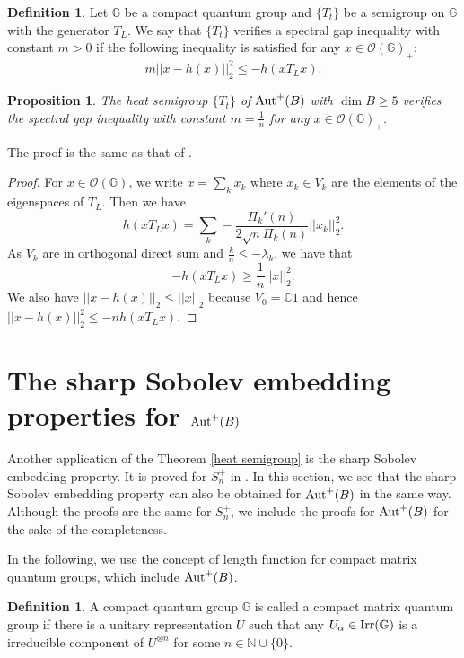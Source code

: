 \documentclass[12pt]{amsart}
\theoremstyle{plain} %
\newtheorem{proposition}[equation]{Proposition}
\theoremstyle{definition}
\newtheorem{definition}[equation]{Definition}
\theoremstyle{remark}
\begin{document}
  \begin{definition}
 Let $\mathbb{G}$ be a compact quantum group and $\{T_t\}$ be a semigroup on $\mathbb{G}$ with the generator $T_L$. We say that $\{T_t\}$ verifies a spectral gap inequality with constant $m>0$ if the following inequality is satisfied for any $x\in \mathcal{O}(\mathbb{G})_+$:
 \[m||x-h(x)||_2^2\leq-h(xT_Lx).\]
 \end{definition}
 
  \begin{proposition}
 The heat semigroup $\{T_t\}$ of ${\rm Aut}^+(B)$ with $\dim B\geq5$ verifies the spectral gap inequality with constant $m=\frac{1}{n}$ for any $x\in \mathcal{O}(\mathbb{G})_+$.
 \end{proposition}
 
 The proof is the same as that of \cite[Proposition 3.2]{FHLUZ}.
 \begin{proof}
 For $x\in \mathcal{O}(\mathbb{G})$, we write $x=\sum_k x_k$ where $x_k\in V_k$ are the elements of the eigenspaces of $T_L$. Then we have 
 \[h(xT_Lx)=\sum_k -\frac{\Pi_k'(n)}{2\sqrt{n}\Pi_k(n)}||x_k||_2^2.\]
 As $V_k$ are in orthogonal direct sum and $\frac{k}{n}\leq -\lambda_k$, we have that
 \[-h(xT_Lx)\geq \frac{1}{n}||x||_2^2.\]
 We also have $||x-h(x)||_2\leq||x||_2$ because $V_0=\mathbb{C}1$ and hence $||x-h(x)||_2^2\leq-nh(xT_Lx).$
 \end{proof}
 
 \section{The sharp Sobolev embedding properties for ${\rm Aut}^+(B)$}

Another application of the Theorem \ref{heat semigroup} is the sharp Sobolev embedding property. It is proved for $S_n^+$ in \cite{You20}. In this section, we see that the sharp Sobolev embedding property can also be obtained for ${\rm Aut}^+(B)$ in the same way. Although the proofs are the same for $S_n^+$, we include the proofs for ${\rm Aut}^+(B)$ for the sake of the completeness.


In the following, we use the concept of length function for compact matrix quantum groups, which include ${\rm Aut}^+(B)$.

 \begin{definition}
A compact quantum group $\mathbb{G}$ is called a compact matrix quantum group if there is a unitary representation $U$ such that any $U_{\alpha}\in {\rm Irr}(\mathbb{G})$ is a irreducible component of $U^{\otimes n}$ for some $n\in \mathbb{N}\cup\{0\}$. 
\end{definition}
\end{document}
